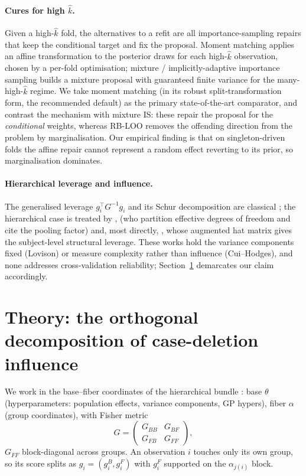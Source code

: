 \documentclass[11pt]{article}
\newcommand{\khat}{\hat{k}}
\newcommand{\GFF}{G_{FF}}
\newcommand{\GBB}{G_{BB}}
\newcommand{\GBF}{G_{BF}}
\begin{document}
\paragraph{Cures for high $\khat$.}
Given a high-$\khat$ fold, the alternatives to a refit are all
importance-sampling repairs that keep the conditional target and fix the proposal.
Moment matching \citep{paananen2021implicitly} applies an affine transformation to
the posterior draws for each high-$\khat$ observation, chosen by a per-fold
optimisation; mixture / implicitly-adaptive importance sampling
\citep{silva2024robust} builds a mixture proposal with guaranteed finite variance
for the many-high-$\khat$ regime. We take moment matching (in its robust
split-transformation form, the recommended default) as the primary state-of-the-art
comparator, and contrast the mechanism with mixture IS: these repair the proposal
for the \emph{conditional} weights, whereas RB-LOO removes the offending direction
from the problem by marginalisation. Our empirical finding is that on
singleton-driven folds the affine repair cannot represent a random effect reverting
to its prior, so marginalisation dominates.

\paragraph{Hierarchical leverage and influence.}
The generalised leverage $g_i^\top G^{-1} g_i$ and its Schur decomposition are
classical \citep{wei1998generalized}; the hierarchical case is treated by
\citet{hodges2001counting}, \citet{cui2010partitioning} (who partition effective
degrees of freedom and cite the pooling factor) and, most directly,
\citet{lovison2026augmented}, whose augmented hat matrix gives the subject-level
structural leverage. These works hold the variance components fixed (Lovison) or
measure complexity rather than influence (Cui--Hodges), and none addresses
cross-validation reliability; Section~\ref{sec:theory} demarcates our claim
accordingly.

\section{Theory: the orthogonal decomposition of case-deletion influence}\label{sec:theory}

We work in the base--fiber coordinates of the hierarchical bundle
\citep{bindoff2026fibr}: base $\theta$ (hyperparameters: population effects,
variance components, GP hypers), fiber $\alpha$ (group coordinates), with Fisher
metric
\[
G = \begin{pmatrix} \GBB & \GBF \\ G_{FB} & \GFF \end{pmatrix},
\]
$\GFF$ block-diagonal across groups. An observation $i$ touches only its own
group, so its score splits as $g_i = (g_i^B, g_i^F)$ with $g_i^F$ supported on the
$\alpha_{j(i)}$ block.
\end{document}

